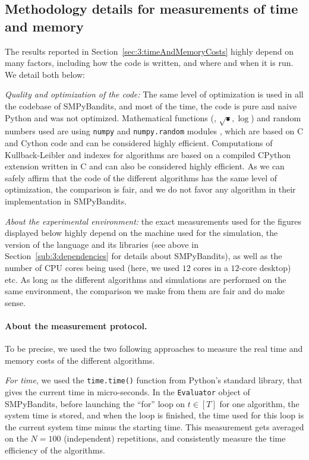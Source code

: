 \subsection{Methodology details for measurements of time and memory}
\label{sub:3:precautionsTimeMemory}

The results reported in Section~\ref{sec:3:timeAndMemoryCosts} highly depend on many factors, including how the code is written, and where and when it is run.
We detail both below:

    \emph{Quality and optimization of the code:}
    The same level of optimization is used in all the codebase of SMPyBandits, and most of the time, the code is pure and naive Python and was not optimized.
    Mathematical functions (\eg, $\sqrt{\bullet}, \log$) and random numbers used are using \texttt{numpy} and \texttt{numpy.random} modules \cite{numpy}, which are based on C and Cython code \cite{cython} and can be considered highly efficient.
    Computations of Kullback-Leibler and indexes for \klUCB{} algorithms are based on a compiled CPython extension written in C \cite{python} and can also be considered highly efficient.
    As we can safely affirm that the code of the different algorithms has the same level of optimization, the comparison is fair, and we do not favor any algorithm in their implementation in SMPyBandits.

    \emph{About the experimental environment:}
    the exact measurements used for the figures displayed below highly depend on the machine used for the simulation, the version of the language and its libraries (see above in Section~\ref{sub:3:dependencies} for details about SMPyBandits), as well as the number of CPU cores being used (here, we used $12$ cores in a $12$-core desktop) etc.
    As long as the different algorithms and simulations are performed on the same environment, the comparison we make from them are fair and do make sense.


\paragraph{About the measurement protocol.}
%
To be precise, we used the two following approaches to measure the real time and memory costs of the different algorithms.

    \emph{For time}, we used the \texttt{time.time()} function from Python's standard library, that gives the current time in micro-seconds.
    In the \texttt{Evaluator} object of SMPyBandits, before launching the ``for'' loop on $t\in[T]$ for one algorithm, the system time is stored, and when the loop is finished, the time used for this loop is the current system time minus the starting time.
    This measurement gets averaged on the $N=100$ (independent) repetitions, and consistently measure the time efficiency of the algorithms.

